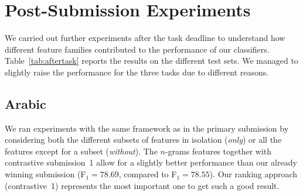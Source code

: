\section{Post-Submission Experiments}
\label{sec:discussion}

We carried out further experiments after the task deadline to understand how 
different feature families contributed to the performance of our classifiers. 
Table~\ref{tab:aftertask} reports the results on the different test sets. We 
managed to slightly raise the performance for the three tasks due to different 
reasons.

\subsection{Arabic} \label{sec:discussionArabic}

We ran experiments with the same framework as in the primary submission by 
considering both the different subsets of features in isolation (\textit{only}) 
or all the features except for a subset (\textit{without}). The $n$-grams 
features together with contrastive submission~1 allow for a slightly better 
performance than our already winning submission (F$_1=78.69$, compared to 
F$_1=78.55$). Our ranking approach (contrastive~1) represents the most 
important one to get such a good result. 

